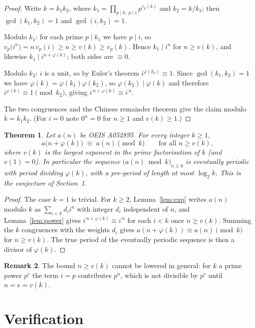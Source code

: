 \documentclass[11pt,a4paper]{article}
\theoremstyle{plain}
\newtheorem{theorem}{Theorem}
\theoremstyle{definition}
\newtheorem{remark}[theorem]{Remark}
\begin{document}
\begin{proof}
Write $k=k_1k_2$, where $k_1=\prod_{p\mid k,\ p\mid i}p^{v_p(k)}$ and $k_2=k/k_1$; then
$\gcd(k_1,k_2)=1$ and $\gcd(i,k_2)=1$.

Modulo $k_1$: for each prime $p\mid k_1$ we have $p\mid i$, so
$v_p\bigl(i^{n}\bigr)=n\,v_p(i)\ge n\ge v(k)\ge v_p(k)$. Hence $k_1\mid i^{n}$ for
$n\ge v(k)$, and likewise $k_1\mid i^{n+\varphi(k)}$; both sides are $\equiv 0$.

Modulo $k_2$: $i$ is a unit, so by Euler's theorem $i^{\varphi(k_2)}\equiv 1$. Since
$\gcd(k_1,k_2)=1$ we have $\varphi(k)=\varphi(k_1)\varphi(k_2)$, so
$\varphi(k_2)\mid\varphi(k)$ and therefore $i^{\varphi(k)}\equiv 1 \pmod{k_2}$, giving
$i^{\,n+\varphi(k)}\equiv i^{\,n}$.

The two congruences and the Chinese remainder theorem give the claim modulo $k=k_1k_2$.
(For $i=0$ note $0^{n}=0$ for $n\ge 1$ and $v(k)\ge1$.)
\end{proof}

\begin{theorem}\label{thm:main}
Let $a(n)$ be OEIS A052895. For every integer $k\ge1$,
\[
a\bigl(n+\varphi(k)\bigr)\;\equiv\;a(n)\pmod{k}\qquad\text{for all } n\ge v(k),
\]
where $v(k)$ is the largest exponent in the prime factorisation of $k$ (and $v(1)=0$).
In particular the sequence $\bigl(a(n)\bmod k\bigr)_{n\ge0}$ is eventually periodic with
period dividing $\varphi(k)$, with a pre-period of length at most $\log_2 k$. This is the
conjecture of Section~1.
\end{theorem}

\begin{proof}
The case $k=1$ is trivial. For $k\ge2$, Lemma~\ref{lem:exp} writes $a(n)$ modulo $k$ as
$\sum_{i<k}d_i i^{n}$ with integer $d_i$ independent of $n$, and Lemma~\ref{lem:power}
gives $i^{\,n+\varphi(k)}\equiv i^{\,n}$ for each $i<k$ once $n\ge v(k)$. Summing the
$k$ congruences with the weights $d_i$ gives
$a(n+\varphi(k))\equiv a(n)\pmod k$ for $n\ge v(k)$. The true period of the eventually
periodic sequence is then a divisor of $\varphi(k)$.
\end{proof}

\begin{remark}
The bound $n\ge v(k)$ cannot be lowered in general: for $k$ a prime power $p^{e}$ the
term $i=p$ contributes $p^{n}$, which is not divisible by $p^{e}$ until $n=e=v(k)$.
\end{remark}

\section{Verification}
\end{document}

